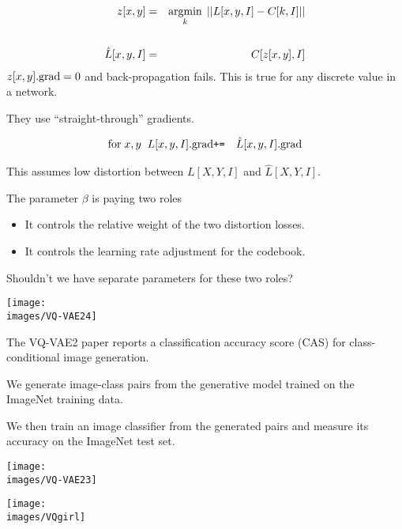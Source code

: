 {


{\huge
\begin{eqnarray*}
z[x,y] & = & \operatorname*{argmin}_k \;||L[x,y,I] - C[k,I]|| \\
\\
\hat{L}[x,y,I] & = & C[z[x,y],I]
\end{eqnarray*}
}
$z[x,y].\mathrm{grad} = 0$ and back-propagation fails.  This is true for any discrete value in a network.

\vfill
They use ``straight-through'' gradients.

\begin{eqnarray*}
\mathrm{for}\;x,y\;\;L[x,y,I].\mathrm{grad} & \mbox{\tt +=} & \hat{L}[x,y,I].\mathrm{grad}
\end{eqnarray*}

\vfill
This assumes low distortion between $L[X,Y,I]$ and $\hat{L}[X,Y,I]$.


The parameter $\beta$ is paying two roles

\vfill
\begin{itemize}
\item It controls the relative weight of the two distortion losses.

\vfill
\item It controls the learning rate adjustment for the codebook.
\end{itemize}

\vfill
Shouldn't we have separate parameters for these two roles?

\centerline{\texttt{[image: \\images/VQ-VAE24]}}


The VQ-VAE2 paper reports a classification accuracy score (CAS) for class-conditional image generation.

\vfill
We generate image-class pairs from the generative model trained on the ImageNet training data.

\vfill
We then train an image classifier from the generated pairs and measure its accuracy on the ImageNet test set.

\vfill
\centerline{\texttt{[image: \\images/VQ-VAE23]}}


\vfill
\centerline{\texttt{[image: \\images/VQgirl]}}


}
